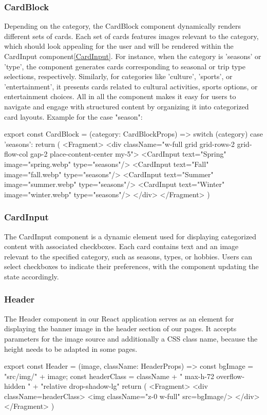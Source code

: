 \documentclass[english,notitlepage,smartquotes]{hgbreport}
\begin{document}
\subsubsection{CardBlock} \label{CardBlockComponent}
Depending on the category, the CardBlock component dynamically renders different sets of cards. Each set of cards features images relevant to the category, which should look appealing for the user and will be rendered within the CardInput component\ref{CardInput}. For instance, when the category is 'seasons' or 'type', the component generates cards corresponding to seasonal or trip type selections, respectively. Similarly, for categories like 'culture', 'sports', or 'entertainment', it presents cards related to cultural activities, sports options, or entertainment choices. All in all the component makes it easy for users to navigate and engage with structured content by organizing it into categorized card layouts. Example for the case "season":
\begin{JsCode}
export const CardBlock = ({category}: CardBlockProps) => {
	switch (category) {
		case 'seasons':
		return (
			<Fragment>
				<div className="w-full grid grid-rows-2 grid-flow-col gap-2
				place-content-center my-5">
				   <CardInput text="Spring" image="spring.webp" type="seasons"/>
				   <CardInput text="Fall" image="fall.webp" type="seasons"/>
				   <CardInput text="Summer" image="summer.webp" type="seasons"/>
				   <CardInput text="Winter" image="winter.webp" type="seasons"/>
				</div>
			</Fragment>
		)
	}
}
\end{JsCode}

\subsubsection{CardInput}
The CardInput component is a dynamic element used for displaying categorized content with associated checkboxes. Each card contains text and an image relevant to the specified category, such as seasons, types, or hobbies. Users can select checkboxes to indicate their preferences, with the component updating the state accordingly.

\subsubsection{Header}
The Header component in our React application serves as an element for displaying the banner image in the header section of our pages. It accepts parameters for the image source and additionally a CSS class name, because the height needs to be adapted in some pages.
\begin{JsCode}
	export const Header = ({image, className}: HeaderProps) => {
		const bgImage = "src/img/" + image;
		const headerClass = className + " max-h-72 overflow-hidden " +
		"relative drop-shadow-lg"
		return (
		<Fragment>
		<div className={headerClass}>
		<img className="z-0 w-full" src={bgImage}/>
		</div>
		</Fragment>
		)
	}
\end{JsCode}
\end{document}
